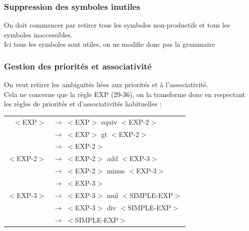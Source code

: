 \documentclass[a4paper,10pt]{article}
\begin{document}
\subsubsection{Suppression des symboles inutiles}

	On doit commencer par retirer tous les symboles non-productifs et tous les symboles inaccessibles.\\
	Ici tous les symboles sont utiles, on ne modifie donc pas la grammaire

\subsubsection{Gestion des priorités et associativité}
	On veut retirer les ambiguïtés liées aux priorités et à l'associativité.\\
	Cela ne concerne que la règle EXP (29-36), on la transforme donc en respectant les règles de priorités et d'associativités habituelles : \\

	\begin{center}\begin{tabular}{rl}
		$<$EXP$>$			& $\rightarrow$ $<$EXP$>$ equiv $<$EXP-2$>$ \\
							& $\rightarrow$ $<$EXP$>$ gt $<$EXP-2$>$ \\ 
							& $\rightarrow$ $<$EXP-2$>$ \\
					
		$<$EXP-2$>$			& $\rightarrow$ $<$EXP-2$>$ add $<$EXP-3$>$   \\
							& $\rightarrow$ $<$EXP-2$>$ minus $<$EXP-3$>$ \\ 
							& $\rightarrow$ $<$EXP-3$>$ \\

		$<$EXP-3$>$			& $\rightarrow$ $<$EXP-3$>$ mul $<$SIMPLE-EXP$>$  \\
							& $\rightarrow$ $<$EXP-3$>$ div $<$SIMPLE-EXP$>$\\ 
							& $\rightarrow$ $<$SIMPLE-EXP$>$ \\					
	\end{tabular}\end{center}
\end{document}
